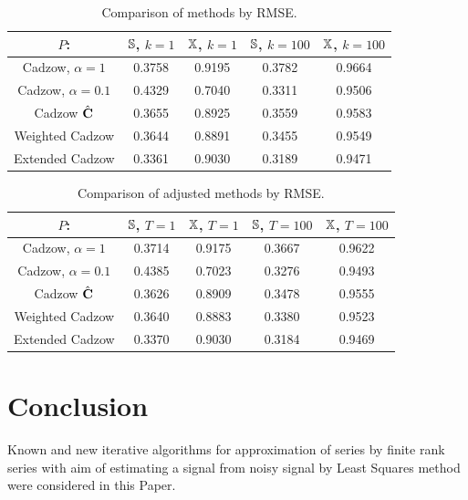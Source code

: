 \documentclass[12pt,a4paper,fleqn,leqno]{article}
\begin{document}
\begin{table}[!hhh]
\begin{center}
\caption{Comparison of methods by RMSE.}\label{fintable}
\begin{tabular}{|c|c|c|c|c|}
\hline
$P$: & $\mathbb{S}$, $k = 1$ & $\mathbb{X}$, $k = 1$ & $\mathbb{S}$, $k = 100$ & $\mathbb{X}$, $k = 100$  \\
\hline
Cadzow, $\alpha = 1$ & 0.3758 & 0.9195 & 0.3782 & 0.9664 \\
\hline
Cadzow, $\alpha = 0.1$ & 0.4329 & 0.7040 & 0.3311 & 0.9506 \\
\hline
Cadzow $\hat{\mathbf{C}}$ & 0.3655 & 0.8925 & 0.3559 & 0.9583 \\
\hline
Weighted Cadzow & 0.3644 & 0.8891 & 0.3455 & 0.9549 \\
\hline
Extended Cadzow & 0.3361 & 0.9030 & 0.3189 & 0.9471 \\
\hline
\end{tabular}
\end{center}
\end{table}

\begin{table}[!hhh]
	\begin{center}
		\caption{Comparison of adjusted methods by RMSE.}\label{fintable_improved}
		\begin{tabular}{|c|c|c|c|c|}
			\hline
			$P$: & $\mathbb{S}$, $T = 1$ & $\mathbb{X}$, $T = 1$ & $\mathbb{S}$, $T = 100$ & $\mathbb{X}$, $T = 100$  \\
			\hline
			Cadzow, $\alpha = 1$ & 0.3714 & 0.9175 & 0.3667 & 0.9622 \\
			\hline
			Cadzow, $\alpha = 0.1$ & 0.4385 & 0.7023 & 0.3276 & 0.9493 \\
			\hline
			Cadzow $\hat{\mathbf{C}}$ & 0.3626 & 0.8909 & 0.3478 & 0.9555 \\
			\hline
			Weighted Cadzow & 0.3640 & 0.8883 & 0.3380 & 0.9523 \\
			\hline
			Extended Cadzow & 0.3370 & 0.9030 & 0.3184 & 0.9469 \\
			\hline
		\end{tabular}
	\end{center}
\end{table}

\section{Conclusion}
\label{sec:concl}
Known and new iterative algorithms for approximation of series by finite rank series with aim of estimating a signal from noisy signal by Least Squares method were considered in this Paper.
\end{document}
